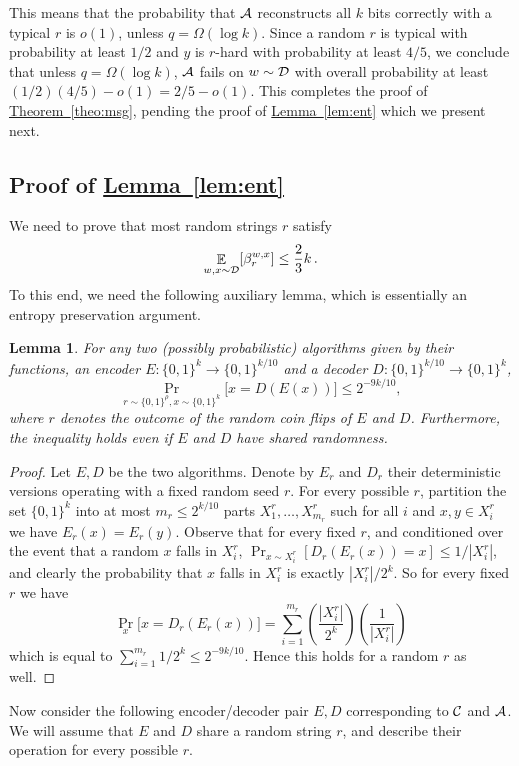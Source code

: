 \documentclass[10pt]{article}
\newtheorem{lemma}[theorem]{Lemma}
\theoremstyle{definition}
\numberwithin{equation}{section}
\newcommand{\expref}[2]{\texorpdfstring{\hyperref[#2]{#1~\ref{#2}}}{#1~\ref{#2}}}
\DeclareMathOperator*{\Exp}{{\mathbb{E}}}
\newcommand{\ALG}{{\cal A}}
\newcommand{\DD}{{\cal D}}
\newcommand{\CC}{{\cal C}}
\newcommand{\zo}{{\{0,1\}}}
\begin{document}
This means that the probability that $\ALG$ reconstructs all $k$ bits correctly with a typical $r$ is $o(1)$, unless $q = \Omega(\log k)$. Since a random $r$ is typical with probability at least $1/2$ and $y$ is $r$-hard with probability at least $4/5$, we conclude that unless $q = \Omega(\log k)$, $\ALG$ fails on $w \sim \DD$ with overall probability at least $(1/2)(4/5) - o(1) = 2/5 -o(1)$. This completes the proof of \expref{Theorem}{theo:msg}, pending the proof of \expref{Lemma}{lem:ent} which we present next.


\subsection{Proof of \expref{Lemma}{lem:ent}} \label{sec:proof_ent}
%
We need to prove that most random strings $r$ satisfy
\[
\Exp_{w,x \sim \DD} [ \beta_r^{w,x}] \leq \frac{2}{3}k\,.
\]
To this end, we need the following auxiliary lemma, which is essentially an entropy preservation argument.
\begin{lemma}\label{lem:en_dec}
For any two (possibly probabilistic) algorithms given by their functions, an encoder $E:\zo^k \to \zo^{k/10}$ and a decoder $D:\zo^{k/10} \to \zo^k$, $$\Pr_{r \sim \zo^\rho,x \sim \zo^k}\big[x = D(E(x))\big] \leq 2^{-9k/10},$$ where $r$ denotes the outcome of the random coin flips of $E$ and $D$. Furthermore, the inequality holds even if $E$ and $D$ have shared randomness.
\end{lemma}
\begin{proof}
Let $E,D$ be the two algorithms. Denote by $E_r$ and $D_r$ their deterministic versions operating with a fixed random seed $r$.
For every possible $r$, partition the set $\zo^k$ into at most ${m_r}
\leq 2^{k/10}$ parts $X^r_1,\ldots,X^r_{m_r}$ such for all $i$ and
$x,y \in X^r_i$ we have $E_r(x) = E_r(y)$. Observe that for every
fixed $r$, and conditioned over the event that a random $x$ falls in
$X^r_i$, $\Pr_{x \sim X_i^r}[D_r(E_r(x)) = x] \leq 1/|X^r_i|$, and
clearly the probability that $x$ falls in $X^r_i$ is exactly
$|X^r_i|/2^k$. So for every fixed $r$ we have 
\[
\Pr_{x}\bigl[x = D_r(E_r(x))\bigr] = \sum_{i=1}^{m_r}
\left(\frac{|X^r_i|}{2^k}\right)\left(\frac{1}{|X^r_i|}\right)
\]
which is equal to $\sum_{i=1}^{m_r} 1/2^k \leq 2^{-9k/10}$. Hence this holds for a random $r$ as well.
\end{proof}

Now consider the following encoder/decoder pair $E,D$ corresponding to $\CC$ and $\ALG$. We will assume that $E$ and $D$ share a random string $r$, and describe their operation for every possible $r$.
\end{document}
